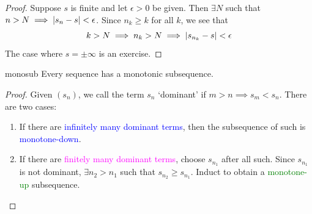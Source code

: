 \begin{proof}
	Suppose $s$ is finite and let $\epsilon>0$ be given. Then $\exists N$ such that $n>N\implies \left| s_n-s\right|<\epsilon$. Since $n_k\ge k$ for all $k$, we see that
	\[k>N\implies n_k>N\implies \left| s_{n_k}-s\right|<\epsilon\]
	The case where $s=\pm\infty$ is an exercise.
\end{proof}

\begin{lemm}{}{monosub}
	Every sequence has a monotonic subsequence.
\end{lemm}

\begin{proof}
	Given $(s_n)$, we call the term $s_n$ `dominant' if $m>n\implies s_m<s_n$. There are two cases:
\begin{enumerate}\itemsep0pt
  \item If there are \textcolor{blue}{infinitely many dominant terms}, then the subsequence of such is \textcolor{blue}{monotone-down}. %
  \item If there are \textcolor{magenta}{finitely many dominant terms}, choose $s_{n_1}$ after all such. Since $s_{n_1}$ is not dominant, $\exists n_2>n_1$ such that $s_{n_2}\ge s_{n_1}$. Induct to obtain a \textcolor{Green}{monotone-up} subsequence.
  \end{enumerate}
  

\end{proof}
